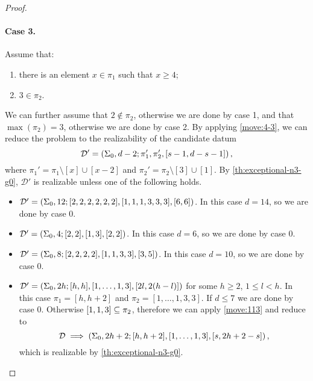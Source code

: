 \documentclass{article}
\begin{document}
\begin{proof}
\paragraph{Case 3.} Assume that:
\begin{enumerate}
\item there is an element $x\in\pi_1$ such that $x\ge 4$;
\item $3\in\pi_2$.
\end{enumerate}
We can further assume that $2\not\in\pi_2$, otherwise we are done by case 1, and that $\max(\pi_2)=3$, otherwise we are done by case 2. By applying \cref{move:4-3}, we can reduce the problem to the realizability of the candidate datum
\[
\mathcal{D}'=\left(\Sigma_0,d-2;\pi_1',\pi_2',[s-1,d-s-1]\right),
\]
where $\pi_1'=\pi_1\setminus[x]\cup[x-2]$ and $\pi_2'=\pi_2\setminus[3]\cup[1]$. By \cref{th:exceptional-n3-g0}, $\mathcal{D}'$ is realizable unless one of the following holds.
\begin{itemize}
\item $\mathcal{D}'=\left(\Sigma_0,12;[2,2,2,2,2,2],[1,1,1,3,3,3],[6,6]\right)$. In this case $d=14$, so we are done by case 0.
\item $\mathcal{D}'=\left(\Sigma_0,4;[2,2],[1,3],[2,2]\right)$. In this case $d=6$, so we are done by case 0.
\item $\mathcal{D}'=\left(\Sigma_0,8;[2,2,2,2],[1,1,3,3],[3,5]\right)$. In this case $d=10$, so we are done by case 0.
\item $\mathcal{D}'=\left(\Sigma_0,2h;[h,h],[1,\ldots,1,3],[2l,2(h-l)]\right)$ for some $h\ge 2$, $1\le l<h$. In this case $\pi_1=[h,h+2]$ and $\pi_2=[1,\ldots,1,3,3]$. If $d\le 7$ we are done by case 0. Otherwise $[1,1,3]\subseteq\pi_2$, therefore we can apply \cref{move:113} and reduce to
\[
\mathcal{D}\implies\left(\Sigma_0,2h+2;[h,h+2],[1,\ldots,1,3],[s,2h+2-s]\right),
\]
which is realizable by \cref{th:exceptional-n3-g0}.
\end{itemize}


\end{proof}
\end{document}
